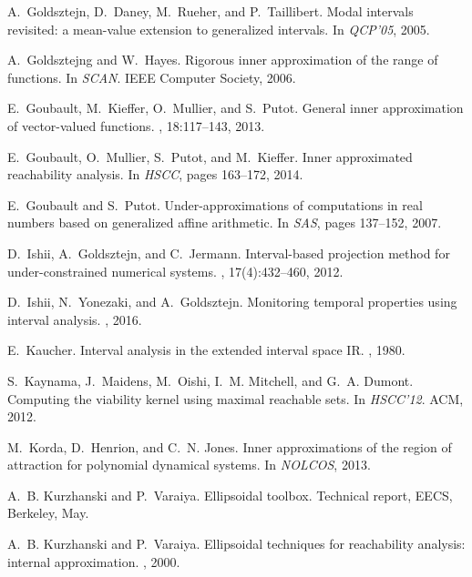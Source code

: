 \documentclass{sig-alternate-05-2015}
\begin{document}
\begin{thebibliography}{10}
A.~Goldsztejn, D.~Daney, M.~Rueher, and P.~Taillibert.
\newblock Modal intervals revisited: a mean-value extension to generalized
  intervals.
\newblock In {\em QCP'05}, 2005.

A.~Goldsztejng and W.~Hayes.
\newblock Rigorous inner approximation of the range of functions.
\newblock In {\em SCAN}. IEEE Computer Society, 2006.

E.~Goubault, M.~Kieffer, O.~Mullier, and S.~Putot.
\newblock General inner approximation of vector-valued functions.
, 18:117--143, 2013.

E.~Goubault, O.~Mullier, S.~Putot, and M.~Kieffer.
\newblock Inner approximated reachability analysis.
\newblock In {\em HSCC}, pages 163--172, 2014.

E.~Goubault and S.~Putot.
\newblock Under-approximations of computations in real numbers based on
  generalized affine arithmetic.
\newblock In {\em SAS}, pages 137--152, 2007.

D.~Ishii, A.~Goldsztejn, and C.~Jermann.
\newblock Interval-based projection method for under-constrained numerical
  systems.
, 17(4):432--460, 2012.

D.~Ishii, N.~Yonezaki, and A.~Goldsztejn.
\newblock Monitoring temporal properties using interval analysis.
, 2016.

E.~Kaucher.
\newblock Interval analysis in the extended interval space {IR}.
, 1980.

S.~Kaynama, J.~Maidens, M.~Oishi, I.~M. Mitchell, and G.~A. Dumont.
\newblock Computing the viability kernel using maximal reachable sets.
\newblock In {\em HSCC'12}. ACM, 2012.

M.~Korda, D.~Henrion, and C.~N. Jones.
\newblock Inner approximations of the region of attraction for polynomial
  dynamical systems.
\newblock In {\em {NOLCOS}}, 2013.

A.~B. Kurzhanski and P.~Varaiya.
\newblock Ellipsoidal toolbox.
\newblock Technical report, EECS, Berkeley, May.

A.~B. Kurzhanski and P.~Varaiya.
\newblock Ellipsoidal techniques for reachability analysis: internal
  approximation.
, 2000.


\end{thebibliography}
\end{document}
